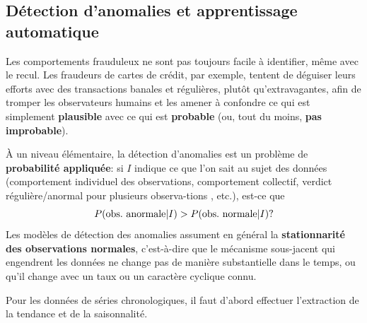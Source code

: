 \subsection{D\'etection d'anomalies et apprentissage automatique}
Les comportements frauduleux ne sont pas toujours facile \`a  identifier, même avec le recul. Les fraudeurs de cartes de crédit, par exemple, tentent de déguiser leurs efforts avec des transactions banales et r\'eguli\`eres, plutôt qu'ex\-tra\-va\-gantes, afin de tromper les observateurs humains et les amener à confondre ce qui est simplement \textbf{plausible} avec ce qui est \textbf{probable} (ou, tout du moins, \textbf{pas improbable}).\par À un niveau élémentaire, la détection d'anomalies est un problème de \textbf{probabilit\'e appliqu\'ee}: si $I$ indique ce que l'on sait au sujet des données (comportement individuel des ob\-ser\-va\-tions, comportement collectif, verdict r\'eguli\`ere/anormal pour plusieurs ob\-ser\-va-tions , etc.), est-ce que  $$P(\text{obs.\@ anormale}|I) > P(\text{obs.\@ normale}|I)?$$ 
Les modèles de détection des anomalies assument en g\'en\'eral la  \textbf{stationnarité des ob\-ser\-va\-tions normales}, c'est-à-dire que le mécanisme sous-jacent qui engendrent les données ne change pas de manière substantielle dans le temps, ou qu'il change avec un taux ou un caractère cyclique connu. \par Pour les données de séries chronologiques, il faut d'abord effectuer l'extraction de la tendance et de la saisonnalité.
